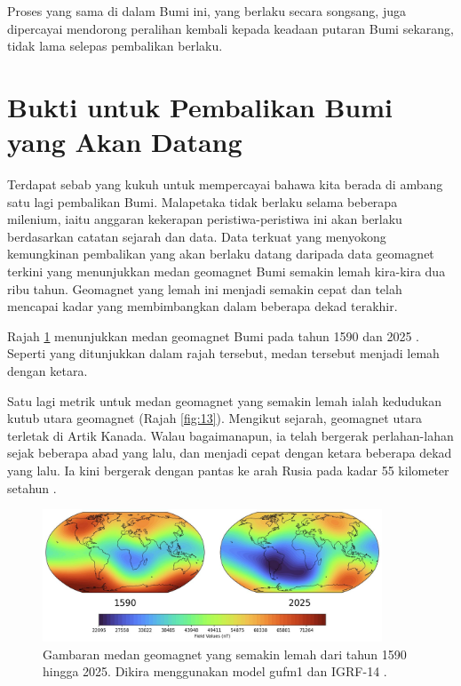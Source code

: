 \documentclass[10pt,twocolumn,letterpaper]{article}
\begin{document}
Proses yang sama di dalam Bumi ini, yang berlaku secara songsang, juga dipercayai mendorong peralihan kembali kepada keadaan putaran Bumi sekarang, tidak lama selepas pembalikan berlaku.

\section{Bukti untuk Pembalikan Bumi yang Akan Datang}
Terdapat sebab yang kukuh untuk mempercayai bahawa kita berada di ambang satu lagi pembalikan Bumi. Malapetaka tidak berlaku selama beberapa milenium, iaitu anggaran kekerapan peristiwa-peristiwa ini akan berlaku berdasarkan catatan sejarah dan data. Data terkuat yang menyokong kemungkinan pembalikan yang akan berlaku datang daripada data geomagnet terkini yang menunjukkan medan geomagnet Bumi semakin lemah kira-kira dua ribu tahun. Geomagnet yang lemah ini menjadi semakin cepat dan telah mencapai kadar yang membimbangkan dalam beberapa dekad terakhir.

Rajah \ref{fig:14} menunjukkan medan geomagnet Bumi pada tahun 1590 dan 2025 \cite{125,126}. Seperti yang ditunjukkan dalam rajah tersebut, medan tersebut menjadi lemah dengan ketara.

Satu lagi metrik untuk medan geomagnet yang semakin lemah ialah kedudukan kutub utara geomagnet (Rajah \ref{fig:13}). Mengikut sejarah, geomagnet utara terletak di Artik Kanada. Walau bagaimanapun, ia telah bergerak perlahan-lahan sejak beberapa abad yang lalu, dan menjadi cepat dengan ketara beberapa dekad yang lalu. Ia kini bergerak dengan pantas ke arah Rusia pada kadar 55 kilometer setahun \cite{124}.

\begin{figure}[t]
\begin{center}
\includegraphics[width=0.9\textwidth]{saa.jpg}
\end{center}
   \caption{Gambaran medan geomagnet yang semakin lemah dari tahun 1590 hingga 2025. Dikira menggunakan model gufm1 dan IGRF-14 \cite{125,126}.}
\label{fig:14}
\end{figure}
\end{document}
